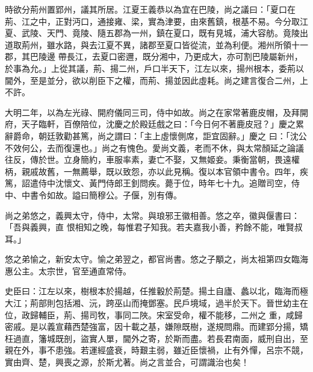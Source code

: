 \begin{pinyinscope}
 時欲分荊州置郢州，議其所居。江夏王義恭以為宜在巴陵，尚之議曰：「夏口在荊、江之中，正對沔口，通接雍、梁，實為津要，由來舊鎮，根基不易。今分取江夏、武陵、天門、竟陵、隨五郡為一州，鎮在夏口，既有見城，浦大容舫。竟陵出道取荊州，雖水路，與去江夏不異，諸郡至夏口皆從流，並為利便。湘州所領十一郡，其巴陵邊
 帶長江，去夏口密邇，既分湘中，乃更成大，亦可割巴陵屬新州，於事為允。」上從其議，荊、揚二州，戶口半天下，江左以來，揚州根本，委荊以閫外，至是並分，欲以削臣下之權，而荊、揚並因此虛耗。尚之建言復合二州，上不許。



 大明二年，以為左光祿、開府儀同三司，侍中如故。尚之在家常著鹿皮帽，及拜開府，天子臨軒，百僚陪位，沈慶之於殿廷戲之曰：「今日何不著鹿皮冠？」慶之累辭爵命，朝廷敦勸甚篤，尚之謂曰：「主上虛懷側席，詎宜固辭。」慶之
 曰：「沈公不效何公，去而復還也。」尚之有愧色。愛尚文義，老而不休，與太常顏延之論議往反，傳於世。立身簡約，車服率素，妻亡不娶，又無姬妾。秉衡當朝，畏遠權柄，親戚故舊，一無薦舉，既以致怨，亦以此見稱。復以本官領中書令。四年，疾篤，詔遣侍中沈懷文、黃門侍郎王釗問疾。薨于位，時年七十九。追贈司空，侍中、中書令如故。謚曰簡穆公。子偃，別有傳。



 尚之弟悠之，義興太守，侍中，太常。與琅邪王徽相善。悠之卒，徽與偃書曰：「吾與義興，直
 恨相知之晚，每惟君子知我。若夫嘉我小善，矜餘不能，唯賢叔耳。」



 悠之弟愉之，新安太守。愉之弟翌之，都官尚書。悠之子顒之，尚太祖第四女臨海惠公主。太宗世，官至通直常侍。



 史臣曰：江左以來，樹根本於揚越，任推轂於荊楚。揚土自廬、蠡以北，臨海而極大江；荊部則包括湘、沅，跨巫山而掩鄧塞。民戶境域，過半於天下。晉世幼主在位，政歸輔臣，荊、揚司牧，事同二陜。宋室受命，權不能移，二州之
 重，咸歸密戚。是以義宣藉西楚強富，因十載之基，嫌隙既樹，遂規問鼎。而建郢分揚，矯枉過直，籓城既剖，盜實人單，閫外之寄，於斯而盡。若長君南面，威刑自出，至親在外，事不患強。若運經盛衰，時艱主弱，雖近臣懷禍，止有外憚，呂宗不競，實由齊、楚，興喪之源，於斯尤著。尚之言並合，可謂識治也矣！



\end{pinyinscope}